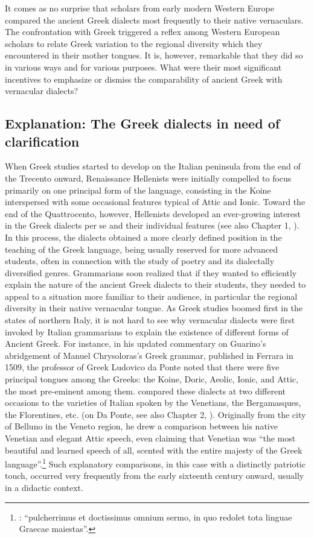 It comes as no surprise that scholars from early modern Western Europe compared the ancient Greek dialects most frequently to their native vernaculars. The confrontation with Greek triggered a reflex among Western European scholars to relate Greek variation to the regional diversity which they encountered in their mother tongues. It is, however, remarkable that they did so in various ways and for various purposes. What were their most significant incentives to emphasize or dismiss the comparability of ancient Greek with vernacular dialects?

\subsection{Explanation: The Greek dialects in need of clarification}\label{sec:8.1.1}


When Greek studies started to develop on the Italian peninsula from the end of the Trecento onward, Renaissance Hellenists were initially compelled to focus primarily on one principal form of the language, consisting in the Koine interspersed with some occasional features typical of Attic and Ionic. Toward the end of the Quattrocento, however, Hellenists developed an ever-growing interest in the Greek dialects per se and their individual features (see also Chapter 1, ). In this process, the dialects obtained a more clearly defined position in the teaching of the Greek language, being usually reserved for more advanced students, often in connection with the study of poetry and its dialectally diversified genres. Grammarians soon realized that if they wanted to efficiently explain the nature of the ancient Greek dialects to their students, they needed to appeal to a situation more familiar to their audience, in particular the regional diversity in their native vernacular tongue. As Greek studies boomed first in the states of northern Italy, it is not hard to see why vernacular dialects were first invoked by Italian grammarians to explain the existence of different forms of Ancient Greek. For instance, in his updated commentary on Guarino’s abridgement of Manuel Chrysoloras’s Greek grammar, published in Ferrara in 1509, the professor of Greek Ludovico da Ponte noted that there were five principal tongues among the Greeks: the Koine, Doric, Aeolic, Ionic, and Attic, the most pre-eminent among them.  compared these dialects at two different occasions to the varieties of Italian spoken by the Venetians, the Bergamasques, the Florentines, etc. (on Da Ponte, see also Chapter 2, ). Originally from the city of Belluno in the Veneto region, he drew a comparison between his native Venetian and elegant Attic speech, even claiming that Venetian was “the most beautiful and learned speech of all, scented with the entire majesty of the Greek language”.\footnote{: “pulcherrimus et doctissimus omnium sermo, in quo redolet tota linguae Graecae maiestas”.} Such explanatory comparisons, in this case with a distinctly patriotic touch, occurred very frequently from the early sixteenth century onward, usually in a didactic context.

